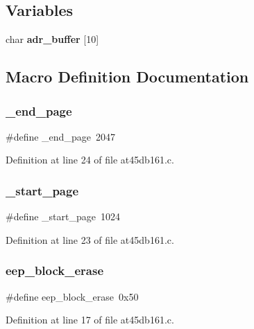 \subsection*{Variables}
\begin{DoxyCompactItemize}
\item 
char \textbf{ adr\+\_\+buffer} [10]
\end{DoxyCompactItemize}


\subsection{Macro Definition Documentation}
\mbox{\label{at45db161_8c_aa5f5305063d83d14d10e46d40f9d1b62}} 
\subsubsection{\+\_\+end\+\_\+page}
{\footnotesize\ttfamily \#define \+\_\+end\+\_\+page~2047}



Definition at line 24 of file at45db161.\+c.

\mbox{\label{at45db161_8c_adf43f7050f8218a42a05413c76abe4d1}} 
\subsubsection{\+\_\+start\+\_\+page}
{\footnotesize\ttfamily \#define \+\_\+start\+\_\+page~1024}



Definition at line 23 of file at45db161.\+c.

\mbox{\label{at45db161_8c_a23f2fe088e4315b3f6ea82f87dd19b08}} 
\subsubsection{eep\+\_\+block\+\_\+erase}
{\footnotesize\ttfamily \#define eep\+\_\+block\+\_\+erase~0x50}



Definition at line 17 of file at45db161.\+c.

